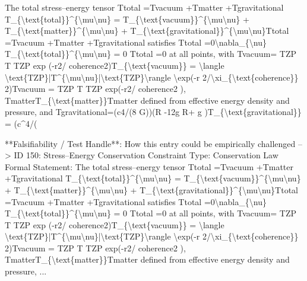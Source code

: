 The total stress--energy tensor Ttotal  =Tvacuum  +Tmatter  +Tgravitational  T\_\{\textbackslash{}text\{total\}\}\textasciicircum{}\{\textbackslash{}mu\textbackslash{}nu\} = T\_\{\textbackslash{}text\{vacuum\}\}\textasciicircum{}\{\textbackslash{}mu\textbackslash{}nu\} + T\_\{\textbackslash{}text\{matter\}\}\textasciicircum{}\{\textbackslash{}mu\textbackslash{}nu\} + T\_\{\textbackslash{}text\{gravitational\}\}\textasciicircum{}\{\textbackslash{}mu\textbackslash{}nu\}Ttotal   =Tvacuum   +Tmatter   +Tgravitational   satisfies   Ttotal  =0\textbackslash{}nabla\_\{\textbackslash{}nu\} T\_\{\textbackslash{}text\{total\}\}\textasciicircum{}\{\textbackslash{}mu\textbackslash{}nu\} = 0   Ttotal   =0 at all points, with Tvacuum= TZP T   TZP exp (-r2/ coherence2)T\_\{\textbackslash{}text\{vacuum\}\} = \textbackslash{}langle \textbackslash{}text\{TZP\}|T\textasciicircum{}\{\textbackslash{}mu\textbackslash{}nu\}|\textbackslash{}text\{TZP\}\textbackslash{}rangle \textbackslash{}exp(-r 2/\textbackslash{}xi\_\{\textbackslash{}text\{coherence\}\} 2)Tvacuum = TZP T   TZP exp(-r2/ coherence2 ), TmatterT\_\{\textbackslash{}text\{matter\}\}Tmatter defined from effective energy density and pressure, and Tgravitational=(c4/(8 G))(R  -12g  R+ g  )T\_\{\textbackslash{}text\{gravitational\}\} = (c\textasciicircum{}4/(

  **Falsifiability / Test Handle**: How this entry could be empirically challenged --> ID 150: Stress--Energy Conservation Constraint Type: Conservation Law Formal Statement: The total stress--energy tensor Ttotal  =Tvacuum  +Tmatter  +Tgravitational  T\_\{\textbackslash{}text\{total\}\}\textasciicircum{}\{\textbackslash{}mu\textbackslash{}nu\} = T\_\{\textbackslash{}text\{vacuum\}\}\textasciicircum{}\{\textbackslash{}mu\textbackslash{}nu\} + T\_\{\textbackslash{}text\{matter\}\}\textasciicircum{}\{\textbackslash{}mu\textbackslash{}nu\} + T\_\{\textbackslash{}text\{gravitational\}\}\textasciicircum{}\{\textbackslash{}mu\textbackslash{}nu\}Ttotal   =Tvacuum   +Tmatter   +Tgravitational   satisfies   Ttotal  =0\textbackslash{}nabla\_\{\textbackslash{}nu\} T\_\{\textbackslash{}text\{total\}\}\textasciicircum{}\{\textbackslash{}mu\textbackslash{}nu\} = 0   Ttotal   =0 at all points, with Tvacuum= TZP T   TZP exp (-r2/ coherence2)T\_\{\textbackslash{}text\{vacuum\}\} = \textbackslash{}langle \textbackslash{}text\{TZP\}|T\textasciicircum{}\{\textbackslash{}mu\textbackslash{}nu\}|\textbackslash{}text\{TZP\}\textbackslash{}rangle \textbackslash{}exp(-r 2/\textbackslash{}xi\_\{\textbackslash{}text\{coherence\}\} 2)Tvacuum = TZP T   TZP exp(-r2/ coherence2 ), TmatterT\_\{\textbackslash{}text\{matter\}\}Tmatter defined from effective energy density and pressure, ...
\endgroup

